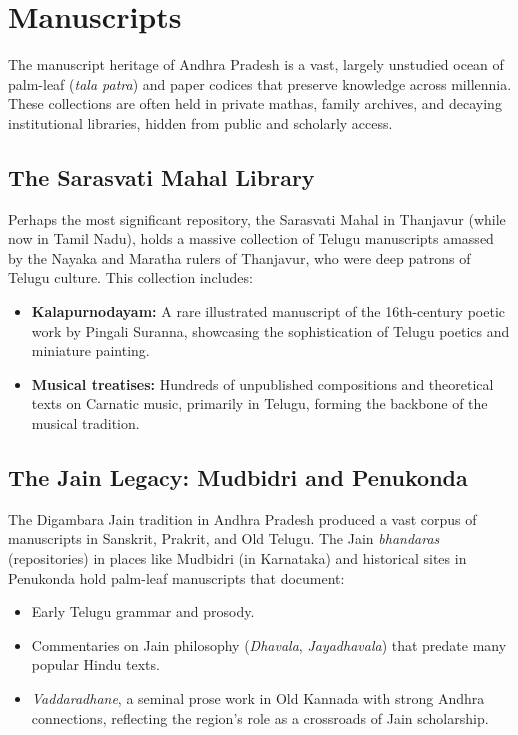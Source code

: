 \documentclass{article}
\begin{document}
\section{Manuscripts}
The manuscript heritage of Andhra Pradesh is a vast, largely unstudied ocean of palm-leaf (\textit{tala patra}) and paper codices that preserve knowledge across millennia. These collections are often held in private mathas, family archives, and decaying institutional libraries, hidden from public and scholarly access.

\subsection{The Sarasvati Mahal Library}
Perhaps the most significant repository, the Sarasvati Mahal in Thanjavur (while now in Tamil Nadu), holds a massive collection of Telugu manuscripts amassed by the Nayaka and Maratha rulers of Thanjavur, who were deep patrons of Telugu culture. This collection includes:
\begin{itemize}
    \item \textbf{Kalapurnodayam:} A rare illustrated manuscript of the 16th-century poetic work by Pingali Suranna, showcasing the sophistication of Telugu poetics and miniature painting.
    \item \textbf{Musical treatises:} Hundreds of unpublished compositions and theoretical texts on Carnatic music, primarily in Telugu, forming the backbone of the musical tradition.
\end{itemize}

\subsection{The Jain Legacy: Mudbidri and Penukonda}
The Digambara Jain tradition in Andhra Pradesh produced a vast corpus of manuscripts in Sanskrit, Prakrit, and Old Telugu. The Jain \textit{bhandaras} (repositories) in places like Mudbidri (in Karnataka) and historical sites in Penukonda hold palm-leaf manuscripts that document:
\begin{itemize}
    \item Early Telugu grammar and prosody.
    \item Commentaries on Jain philosophy (\textit{Dhavala}, \textit{Jayadhavala}) that predate many popular Hindu texts.
    \item \textit{Vaddaradhane}, a seminal prose work in Old Kannada with strong Andhra connections, reflecting the region's role as a crossroads of Jain scholarship.
\end{itemize}
\end{document}
